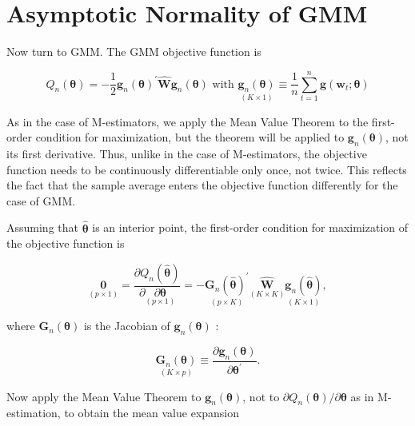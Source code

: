 \documentclass[10pt]{article}
\begin{document}
\section*{Asymptotic Normality of GMM}
Now turn to GMM. The GMM objective function is


\begin{equation*}
Q_{n}(\boldsymbol{\theta})=-\frac{1}{2} \mathbf{g}_{n}(\boldsymbol{\theta})^{\prime} \widehat{\mathbf{W}} \mathbf{g}_{n}(\boldsymbol{\theta}) \text { with } \underset{(K \times 1)}{\mathbf{g}_{n}(\boldsymbol{\theta})} \equiv \frac{1}{n} \sum_{t=1}^{n} \mathbf{g}\left(\mathbf{w}_{t} ; \boldsymbol{\theta}\right) \tag{7.3.27}
\end{equation*}


As in the case of M-estimators, we apply the Mean Value Theorem to the first-order condition for maximization, but the theorem will be applied to $\mathbf{g}_{n}(\boldsymbol{\theta})$, not its first derivative. Thus, unlike in the case of M-estimators, the objective function needs to be continuously differentiable only once, not twice. This reflects the fact that the sample average enters the objective function differently for the case of GMM.

Assuming that $\hat{\boldsymbol{\theta}}$ is an interior point, the first-order condition for maximization of the objective function is


\begin{equation*}
\underset{(p \times 1)}{\mathbf{0}}=\frac{\partial Q_{n}(\hat{\boldsymbol{\theta}})}{\partial \underset{(p \times 1)}{\partial \boldsymbol{\theta}}}=-\underset{(p \times K)}{\mathbf{G}_{n}(\hat{\boldsymbol{\theta}})^{\prime}} \underset{(K \times K)}{\widehat{\mathbf{W}}} \underset{(K \times 1)}{\mathbf{g}_{n}(\hat{\boldsymbol{\theta}})}, \tag{7.3.28}
\end{equation*}


where $\mathbf{G}_{n}(\boldsymbol{\theta})$ is the Jacobian of $\mathbf{g}_{n}(\boldsymbol{\theta})$ :


\begin{equation*}
\underset{(K \times p)}{\mathbf{G}_{n}(\boldsymbol{\theta})} \equiv \frac{\partial \mathbf{g}_{n}(\boldsymbol{\theta})}{\partial \boldsymbol{\theta}^{\prime}} . \tag{7.3.29}
\end{equation*}


Now apply the Mean Value Theorem to $\mathbf{g}_{n}(\boldsymbol{\theta})$, not to $\partial Q_{n}(\boldsymbol{\theta}) / \partial \boldsymbol{\theta}$ as in M-estimation, to obtain the mean value expansion
\end{document}
